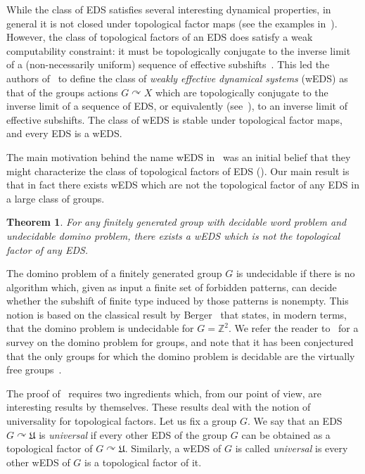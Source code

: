 \documentclass{article}
\theoremstyle{definition}
\theoremstyle{plain}
\newtheorem{thmx}{Theorem}
\newcommand{\ZZ}{\mathbb{Z}}
\newcommand{\define}[1]{\textit{#1}}
\begin{document}
While the class of EDS satisfies several interesting dynamical properties, in general it is not closed under topological factor maps (see the examples in~\cite[Propositions 8.1 and 8.2]{BarCarRoj2025}). However, the class of topological factors of an EDS does satisfy a weak computability constraint: it must be topologically conjugate to the inverse limit of a (non-necessarily uniform) sequence of effective subshifts~\cite[Corollary 8.8]{BarCarRoj2025}. This led the authors of~\cite{BarCarRoj2025} to define the class of \define{weakly effective dynamical systems} (wEDS) as that of the groups actions $G\curvearrowright X$ which are topologically conjugate to the inverse limit of a sequence of EDS, or equivalently (see~), to an inverse limit of effective subshifts. The class of wEDS is stable under topological factor maps, and every EDS is a wEDS.

The main motivation behind the name wEDS in~\cite{BarCarRoj2025} was an initial belief that they might characterize the class of topological factors of EDS (\cite[Question 8.12]{BarCarRoj2025}). Our main result is that in fact there exists wEDS which are not the topological factor of any EDS in a large class of groups.

\begin{thmx}\label{mainthm:nonexistence_factor_to_weds}
    For any finitely generated group with decidable word problem and undecidable domino problem, there exists a wEDS which is not the topological factor of any EDS.
\end{thmx}

The domino problem of a finitely generated group $G$ is undecidable if there is no algorithm which, given as input a finite set of forbidden patterns, can decide whether the subshift of finite type induced by those patterns is nonempty. This notion is based on the classical result by Berger~\cite{berger_undecidability_1966} that states, in modern terms, that the domino problem is undecidable for $G=\ZZ^2$. We refer the reader to~\cite{ABJ2018} for a survey on the domino problem for groups, and note that it has been conjectured that the only groups for which the domino problem is decidable are the virtually free groups~\cite{ballier_domino_2018}.

The proof of~ requires two ingredients which, from our point of view, are interesting results by themselves. These results deal with the notion of universality for topological factors. Let us fix a group $G$. We say that an EDS $G\curvearrowright \mathfrak{U}$ is \define{universal} if every other EDS of the group $G$ can be obtained as a topological factor of $G\curvearrowright \mathfrak{U}$. Similarly, a wEDS of $G$ is called \define{universal} is every other wEDS of $G$ is a topological factor of it.
\end{document}
